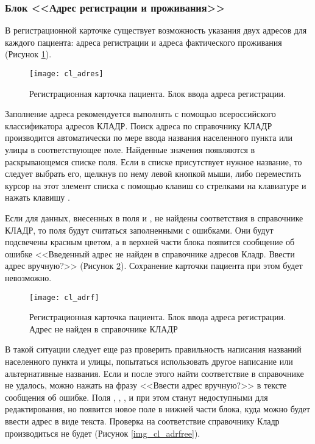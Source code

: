 \subsubsection{Блок <<Адрес регистрации и проживания>>}

В регистрационной карточке существует возможность указания двух адресов для каждого пациента: адреса регистрации и адреса фактического проживания (Рисунок \ref{img_cl_adres}). 

\begin{figure}[ht]\centering
 \texttt{[image: cl\_adres]}
 \caption{Регистрационная карточка пациента. Блок ввода адреса регистрации.}
 \label{img_cl_adres}
\end{figure} 

Заполнение адреса рекомендуется выполнять с помощью всероссийского классификатора адресов КЛАДР. Поиск адреса по справочнику КЛАДР производится автоматически по мере ввода названия населенного пункта или улицы в соответствующее поле. Найденные значения появляются в раскрывающемся списке поля. Если в списке присутствует нужное название, то следует выбрать его, щелкнув по нему левой кнопкой мыши, либо переместить курсор на этот элемент списка с помощью клавиш со стрелками на клавиатуре и нажать клавишу .

Если для данных, внесенных в поля  и , не найдены соответствия в справочнике КЛАДР, то поля будут считаться заполненными с ошибками. Они будут подсвечены красным цветом, а в верхней части блока появится сообщение об ошибке <<Введенный адрес не найден в справочнике адресов Кладр. Ввести адрес вручную?>> (Рисунок \ref{img_cl_adrf}). Сохранение карточки пациента при этом будет невозможно. 

\begin{figure}[ht]\centering
 \texttt{[image: cl\_adrf]}
 \caption{Регистрационная карточка пациента. Блок ввода адреса регистрации. Адрес не найден в справочнике КЛАДР}
 \label{img_cl_adrf}
\end{figure} 

В такой ситуации следует еще раз проверить правильность написания названий населенного пункта и улицы, попытаться использовать другое написание или альтернативные названия. Если и после этого найти соответствие в справочнике не удалось, можно нажать на фразу <<Ввести адрес вручную?>> в тексте сообщения об ошибке. Поля  , , ,  и  при этом станут недоступными для редактирования, но появится новое поле  в нижней части блока, куда можно будет ввести адрес в виде текста. Проверка на соответствие справочнику Кладр производиться не будет (Рисунок \ref{img_cl_adrfree}). 

